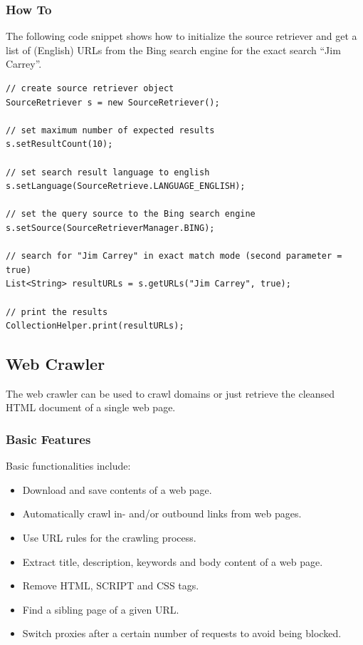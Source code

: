 \documentclass[a4paper,twoside]{book}      %
\begin{document}
\subsubsection{How To}
\label{sec:howto}
The following code snippet shows how to initialize the source retriever and get a list of (English) URLs from the Bing search engine for the exact search ``Jim Carrey''.
\begin{codelisting}
\begin{lstlisting}[frame=tb]
// create source retriever object
SourceRetriever s = new SourceRetriever();
		
// set maximum number of expected results 
s.setResultCount(10);
		
// set search result language to english
s.setLanguage(SourceRetrieve.LANGUAGE_ENGLISH);
		
// set the query source to the Bing search engine 
s.setSource(SourceRetrieverManager.BING);
		
// search for "Jim Carrey" in exact match mode (second parameter = true)
List<String> resultURLs = s.getURLs("Jim Carrey", true);
		
// print the results
CollectionHelper.print(resultURLs);	
\end{lstlisting}
\end{codelisting}


\subsection{Web Crawler}
The web crawler can be used to crawl domains or just retrieve the cleansed HTML document of a single web page.

\subsubsection{Basic Features}
Basic functionalities include:
\begin{itemize}
\item Download and save contents of a web page.
\item Automatically crawl in- and/or outbound links from web pages.
\item Use URL rules for the crawling process.
\item Extract title, description, keywords and body content of a web page.
\item Remove HTML, SCRIPT and CSS tags.
\item Find a sibling page of a given URL.
\item Switch proxies after a certain number of requests to avoid being blocked.
\end{itemize}
\end{document}
